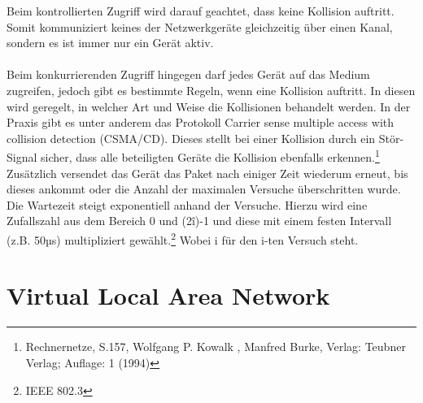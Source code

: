 Beim kontrollierten Zugriff wird darauf geachtet, dass keine Kollision auftritt. Somit kommuniziert keines der Netzwerkgeräte gleichzeitig über einen Kanal, sondern es ist immer nur ein Gerät aktiv.\\\\
Beim konkurrierenden Zugriff hingegen darf jedes Gerät auf das Medium zugreifen, jedoch gibt es bestimmte Regeln, wenn eine Kollision auftritt. In diesen wird geregelt, in welcher Art und Weise die Kollisionen behandelt werden.
In der Praxis gibt es unter anderem das Protokoll Carrier sense multiple access with collision detection (CSMA/CD).
Dieses stellt bei einer Kollision durch ein Stör-Signal sicher, dass alle beteiligten Geräte die Kollision ebenfalls erkennen.\footnote{Rechnernetze, S.157, Wolfgang P. Kowalk , Manfred Burke, Verlag: Teubner Verlag; Auflage: 1 (1994)}
Zusätzlich versendet das Gerät das Paket nach einiger Zeit wiederum erneut, bis dieses ankommt oder die Anzahl der maximalen Versuche überschritten wurde.
Die Wartezeit steigt exponentiell anhand der Versuche.
Hierzu wird eine Zufallszahl aus dem Bereich 0 und (2\^i)-1 und diese mit einem festen Intervall (z.B. 50µs) multipliziert gewählt.\footnote{IEEE 802.3}
Wobei i für den i-ten Versuch steht.

\section{Virtual Local Area Network}
\label{sec:vlan}

